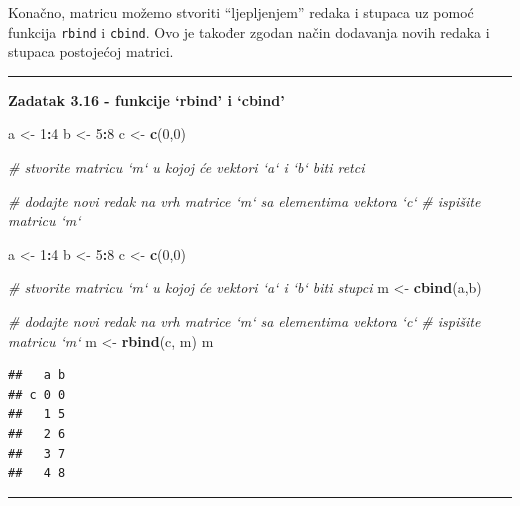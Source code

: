 \documentclass[]{book}
\newenvironment{Shaded}{\begin{snugshade}}{\end{snugshade}}
\newcommand{\KeywordTok}[1]{\textcolor[rgb]{0.13,0.29,0.53}{\textbf{#1}}}
\newcommand{\DecValTok}[1]{\textcolor[rgb]{0.00,0.00,0.81}{#1}}
\newcommand{\StringTok}[1]{\textcolor[rgb]{0.31,0.60,0.02}{#1}}
\newcommand{\CommentTok}[1]{\textcolor[rgb]{0.56,0.35,0.01}{\textit{#1}}}
\newcommand{\OperatorTok}[1]{\textcolor[rgb]{0.81,0.36,0.00}{\textbf{#1}}}
\newcommand{\NormalTok}[1]{#1}
\theoremstyle{definition}
\theoremstyle{definition}
\theoremstyle{definition}
\theoremstyle{remark}
\begin{document}
Konačno, matricu možemo stvoriti ``ljepljenjem'' redaka i stupaca uz
pomoć funkcija \texttt{rbind} i \texttt{cbind}. Ovo je također zgodan
način dodavanja novih redaka i stupaca postojećoj matrici.

\begin{center}\rule{0.5\linewidth}{\linethickness}\end{center}

\textbf{Zadatak 3.16 - funkcije `rbind' i `cbind'}

\begin{Shaded}
\begin{Highlighting}[]
\NormalTok{a <-}\StringTok{ }\DecValTok{1}\OperatorTok{:}\DecValTok{4}
\NormalTok{b <-}\StringTok{ }\DecValTok{5}\OperatorTok{:}\DecValTok{8}
\NormalTok{c <-}\StringTok{ }\KeywordTok{c}\NormalTok{(}\DecValTok{0}\NormalTok{,}\DecValTok{0}\NormalTok{)}

\CommentTok{# stvorite matricu `m` u kojoj će vektori `a` i `b` biti retci}

\CommentTok{# dodajte novi redak na vrh matrice `m` sa elementima vektora `c`}
\CommentTok{# ispišite matricu `m`}
\end{Highlighting}
\end{Shaded}

\begin{Shaded}
\begin{Highlighting}[]
\NormalTok{a <-}\StringTok{ }\DecValTok{1}\OperatorTok{:}\DecValTok{4}
\NormalTok{b <-}\StringTok{ }\DecValTok{5}\OperatorTok{:}\DecValTok{8}
\NormalTok{c <-}\StringTok{ }\KeywordTok{c}\NormalTok{(}\DecValTok{0}\NormalTok{,}\DecValTok{0}\NormalTok{)}

\CommentTok{# stvorite matricu `m` u kojoj će vektori `a` i `b` biti stupci}
\NormalTok{m <-}\StringTok{ }\KeywordTok{cbind}\NormalTok{(a,b)}


\CommentTok{# dodajte novi redak na vrh matrice `m` sa elementima vektora `c`}
\CommentTok{# ispišite matricu `m`}
\NormalTok{m <-}\StringTok{ }\KeywordTok{rbind}\NormalTok{(c, m)}
\NormalTok{m}
\end{Highlighting}
\end{Shaded}

\begin{verbatim}
##   a b
## c 0 0
##   1 5
##   2 6
##   3 7
##   4 8
\end{verbatim}

\begin{center}\rule{0.5\linewidth}{\linethickness}\end{center}
\end{document}
